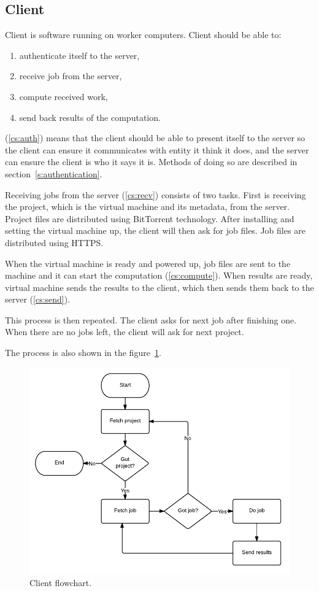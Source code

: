 \subsection{Client}

Client is software running on worker computers. Client should be able to:
\begin{enumerate}
	\item \label{cs:auth} authenticate itself to the server,
	\item \label{cs:recv} receive job from the server,
	\item \label{cs:compute} compute received work,
	\item \label{cs:send} send back results of the computation.
\end{enumerate}

(\ref{cs:auth}) means that the client should be able to present itself to the server so the client can ensure it communicates with entity it think it does, and the server can ensure the client is who it says it is. Methods of doing so are described in section~\ref{s:authentication}.

Receiving jobs from the server (\ref{cs:recv}) consists of two tasks. First is receiving the project, which is the virtual machine and its metadata, from the server. Project files are distributed using BitTorrent technology. After installing and setting the virtual machine up, the client will then ask for job files. Job files are distributed using HTTPS.

When the virtual machine is ready and powered up, job files are sent to the machine and it can start the computation (\ref{cs:compute}). When results are ready, virtual machine sends the results to the client, which then sends them back to the server (\ref{cs:send}).

This process is then repeated. The client asks for next job after finishing one. When there are no jobs left, the client will ask for next project.

The process is also shown in the figure~\ref{f:clientflow}.

\begin{figure}
\centering
\includegraphics{diagrams/ClientFlowchart.pdf}
\caption{Client flowchart.}
\label{f:clientflow}
\end{figure}

